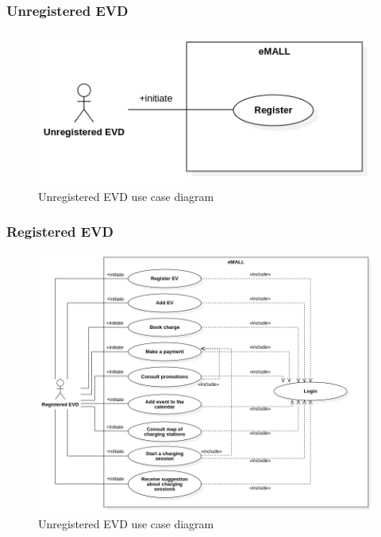 \subsubsection*{Unregistered EVD}
\begin{figure} [H]
    \begin{center}
        \includegraphics[width=0.9\linewidth]{Images/UseCaseDiagrams/unregistered_EVD_use_case_diagram}
        \caption{Unregistered EVD use case diagram}
        \label{fig: unreg_EVD_diag}
    \end{center}
\end{figure}

\subsubsection*{Registered EVD}
\begin{figure} [H]
    \begin{center}
        \includegraphics[width=0.9\linewidth]{Images/UseCaseDiagrams/registered_EVD_use_case_diagram}
        \caption{Unregistered EVD use case diagram}
        \label{fig: reg_EVD_diag}
    \end{center}
\end{figure}

